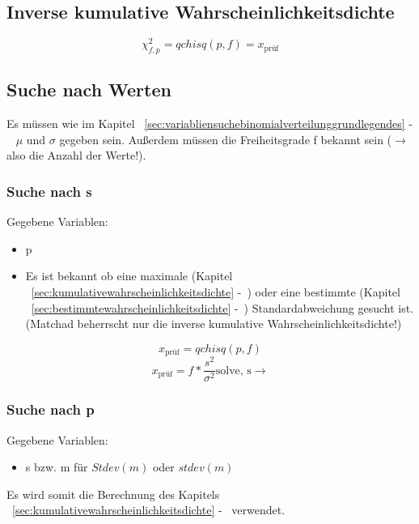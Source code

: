 \documentclass[a4paper,10pt]{article}
\begin{document}
\subsection{Inverse kumulative Wahrscheinlichkeitsdichte}
\begin{equation}
  \chi^2_{f,p} = qchisq(p, f) = x_{\text{prüf}}
\end{equation}

\subsection{Suche nach Werten}
Es müssen wie im Kapitel
~\autoref{sec:variabliensuchebinomialverteilunggrundlegendes}
-~ $ \mu $
und $ \sigma $ gegeben sein. Außerdem müssen die Freiheitsgrade f
bekannt sein ($ \rightarrow $ also die Anzahl der Werte!).

\subsubsection{Suche nach s}
\label{sec:chisuchenachs}
Gegebene Variablen:
\begin{itemize}
\item p
\item Es ist bekannt ob eine maximale (Kapitel
~\autoref{sec:kumulativewahrscheinlichkeitsdichte}
-~) oder eine
bestimmte (Kapitel ~\autoref{sec:bestimmtewahrscheinlichkeitsdichte}
-~) Standardabweichung
gesucht ist. (Matchad beherrscht nur die inverse kumulative
Wahrscheinlichkeitsdichte!)
\end{itemize}

\begin{equation}
  x_{\text{prüf}} = qchisq(p, f)
\end{equation}
\begin{equation}
  x_{\text{prüf}} = f * \frac{s^2}{\sigma^2} \text{solve, s} \rightarrow
\end{equation}

\subsubsection{Suche nach p}
\label{sec:chisuchenachp}
Gegebene Variablen:
\begin{itemize}
\item s bzw. m für $ Stdev(m) $ oder $ stdev(m) $
\end{itemize}

Es wird somit die Berechnung des Kapitels
~\autoref{sec:kumulativewahrscheinlichkeitsdichte}
-~
verwendet.
\end{document}

